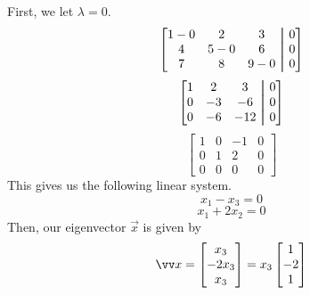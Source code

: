 \documentclass[11pt, letterpaper, twoside]{article}
\newcommand\aug{\fboxsep=-\fboxrule\!\!\!\fbox{\strut}\!\!\!} %
\begin{document}
\begin{enumerate}
First, we let \(\lambda=0\).
\[
\begin{bmatrix}
    1-0&2&3&\aug&0\\
    4&5-0&6&\aug&0\\
    7&8&9-0&\aug&0
\end{bmatrix}
\]
\[
\begin{bmatrix}
    1&2&3&\aug&0\\
    0&-3&-6&\aug&0\\
    0&-6&-12&\aug&0
\end{bmatrix}
\]
\[
\begin{bmatrix}
1&0&-1&0\\
0&1&2&0\\
0&0&0&0
\end{bmatrix}
\]
This gives us the following linear system.
\[x_1-x_3=0\]
\[x_1+2x_2=0\]
Then, our eigenvector \(\vec x\) is given by 
\[\vv x=\begin{bmatrix}
    x_3\\
    -2x_3\\
    x_3\\
\end{bmatrix}=x_3\begin{bmatrix}
    1\\
    -2\\
    1
\end{bmatrix}\]


\end{enumerate}
\end{document}
